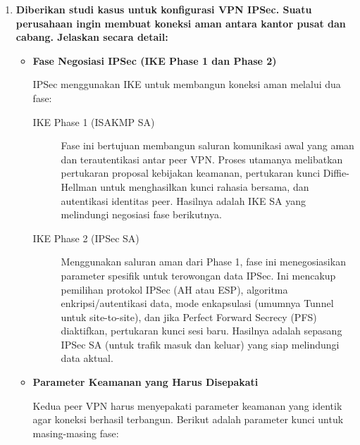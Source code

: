 \begin{enumerate}
    \item \textbf{Diberikan studi kasus untuk konfigurasi VPN IPSec. Suatu perusahaan ingin membuat koneksi aman antara kantor pusat dan cabang. Jelaskan secara detail:}
    
    \begin{itemize}
        \item \textbf{Fase Negosiasi IPSec (IKE Phase 1 dan Phase 2)}
        
        IPSec menggunakan IKE untuk membangun koneksi aman melalui dua fase:
        \begin{description}
            \item[IKE Phase 1 (ISAKMP SA)] Fase ini bertujuan membangun saluran komunikasi awal yang aman dan terautentikasi antar peer VPN. Proses utamanya melibatkan pertukaran proposal kebijakan keamanan, pertukaran kunci Diffie-Hellman untuk menghasilkan kunci rahasia bersama, dan autentikasi identitas peer. Hasilnya adalah IKE SA yang melindungi negosiasi fase berikutnya.

            \item[IKE Phase 2 (IPSec SA)] Menggunakan saluran aman dari Phase 1, fase ini menegosiasikan parameter spesifik untuk terowongan data IPSec. Ini mencakup pemilihan protokol IPSec (AH atau ESP), algoritma enkripsi/autentikasi data, mode enkapsulasi (umumnya Tunnel untuk site-to-site), dan jika Perfect Forward Secrecy (PFS) diaktifkan, pertukaran kunci sesi baru. Hasilnya adalah sepasang IPSec SA (untuk trafik masuk dan keluar) yang siap melindungi data aktual.
        \end{description}

        \item \textbf{Parameter Keamanan yang Harus Disepakati}
        
        Kedua peer VPN harus menyepakati parameter keamanan yang identik agar koneksi berhasil terbangun. Berikut adalah parameter kunci untuk masing-masing fase:
        

\end{itemize}
\end{enumerate}
